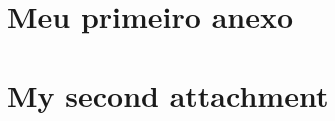 \documentclass[portuguese,oneside]{pucrs-ppgcc}
\begin{document}
\chapter{Meu primeiro anexo}
\chapter{My second attachment}


\end{document}
